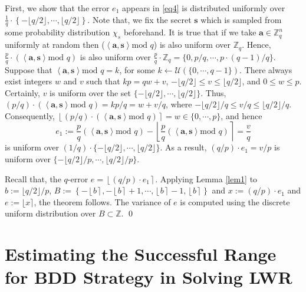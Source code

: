 \documentclass[runningheads]{llncs}
\begin{document}
		First, we show that the error $e_1$ appears in \eqref{eq4} is distributed uniformly over $\frac{1}{q} \cdot \left\{-\lfloor q/2 \rfloor, \cdots, \lfloor q/2 \rfloor \right\}$. 
	Note that, we fix the secret $\mathbf{s}$ which is sampled from some probability distribution $\chi_s$ beforehand. It is true that if we take $\mathbf{a} \in \mathbb{Z}_q^{n}$ uniformly at random then ($\left \langle\mathbf{a}, \mathbf{s} \right\rangle \text{mod }q$) is also uniform over $\mathbb{Z}_q$. Hence, $\frac{p}{q} \cdot (\left \langle\mathbf{a}, \mathbf{s} \right\rangle \text{mod }q)$ is also uniform over $\frac{p}{q} \cdot \mathbb{Z}_q=\{0,p/q,\cdots, p \cdot (q-1)/q\}$. 
	Suppose that $\left \langle\mathbf{a}, \mathbf{s} \right\rangle \text{mod }q=k$, for some $k\leftarrow \mathcal{U}(\{0,\cdots,q-1\})$. There always exist integers $w$ and $v$ such that  $kp=qw+v$, $-\lfloor q/2 \rfloor \leq v \leq \lfloor q/2 \rfloor$, and $ 0 \leq w \leq p$. Certainly, $v$ is uniform over the set $\{-\lfloor q/2 \rfloor ,\cdots,\lfloor q/2 \rfloor \}$. Thus, $(p/q)\cdot (\left \langle\mathbf{a}, \mathbf{s} \right\rangle \text{mod }q)=kp/q=w+v/q$, where $-\lfloor q/2 \rfloor/q \leq v/q \leq  \lfloor q/2 \rfloor/q$.
	Consequently, $\left \lfloor (p/q) \cdot (\left \langle\mathbf{a}, \mathbf{s} \right\rangle \text{mod }q) \right\rceil =w \in \{0,\cdots,p\}$, and hence $$e_1:=\frac{p}{q}(\left \langle\mathbf{a}, \mathbf{s} \right\rangle \text{mod }q)-\left \lfloor \frac{p}{q}(\left \langle\mathbf{a}, \mathbf{s} \right\rangle \text{mod }q) \right\rceil =\frac{v}{q}$$ is uniform over $(1/q) \cdot \{-\lfloor q/2 \rfloor ,\cdots,\lfloor q/2 \rfloor \}$. As a result, $(q/p) \cdot e_1=v/p$ is uniform over $\{-{\lfloor q/2 \rfloor}/p, \cdots, {\lfloor q/2 \rfloor}/p\}.$ 
	
	Recall that, the $q$-error $e=\left \lfloor (q/p) \cdot e_1 \right \rceil.$ Applying Lemma \ref{lem1} to $b:={\lfloor q/2 \rfloor}/{p}$, $B:=\left\{-\left\lfloor b \right \rceil,  -\left\lfloor b \right \rceil+1, \cdots, \left\lfloor b \right \rceil -1, \left\lfloor b \right \rceil \right \}$ and $x:=(q/p) \cdot e_1$ and $e:=\lfloor x \rceil$, the theorem follows. The variance of $e$ is computed using the discrete uniform distribution over $B \subset \mathbb{Z}$.
	\qed
	
\section{Estimating the Successful Range for  BDD Strategy in Solving LWR}
\end{document}
